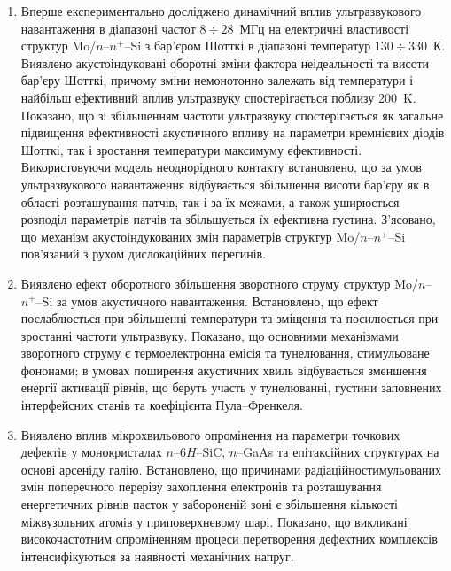 \begin{enumerate}[leftmargin=0cm,itemindent=3em]
\item
Вперше експериментально досліджено динамічний вплив ультразвукового навантаження в діапазоні частот $8\div28$~МГц на електричні властивості структур Mo/$n$--$n^{+}$--Si з бар'єром Шотткі в діапазоні температур $130\div330$~К.
 Виявлено акустоіндуковані оборотні зміни фактора неідеальності та висоти бар'єру Шотткі, причому зміни немонотонно залежать від температури і найбільш ефективний вплив ультразвуку спостерігається поблизу 200~K.
  Показано, що зі збільшенням частоти ультразвуку  спостерігається як загальне підвищення ефективності акустичного впливу на параметри кремнієвих діодів Шотткі,
так і зростання температури максимуму ефективності.
 Використовуючи модель неоднорідного контакту встановлено, що за умов ультразвукового навантаження відбувається збільшення висоти бар'єру як в області розташування патчів, так і за їх межами, а також уширюється розподіл параметрів патчів та збільшується їх ефективна густина.
З'ясовано, що механізм акустоіндукованих змін параметрів структур Mo/$n$--$n^{+}$--Si пов'язаний з рухом дислокаційних перегинів.

\item Виявлено ефект оборотного збільшення зворотного струму структур Mo/$n$--$n^{+}$--Si за умов акустичного навантаження.
Встановлено, що ефект послаблюється при збільшенні температури та зміщення та посилюється при зростанні частоти ультразвуку.
Показано, що основними механізмами зворотного струму є термоелектронна емісія та тунелювання, стимульоване фононами;
в умовах поширення акустичних хвиль відбувається зменшення енергії активації рівнів, що беруть участь у тунелюванні,
густини заповнених інтерфейсних станів та коефіцієнта Пула--Френкеля.

\item Виявлено вплив мікрохвильового опромінення на параметри точкових дефектів у монокристалах $n$--6$H$--SiC, $n$--GaAs та епітаксійних структурах на основі арсеніду галію.
Встановлено, що причинами радіаційностимульованих змін поперечного перерізу захоплення електронів та розташування енергетичних рівнів пасток у забороненій зоні є
збільшення кількості міжвузольних атомів у приповерхневому шарі.
Показано, що викликані високочастотним опроміненням процеси перетворення дефектних комплексів інтенсифікуються за наявності механічних напруг.


\end{enumerate}
